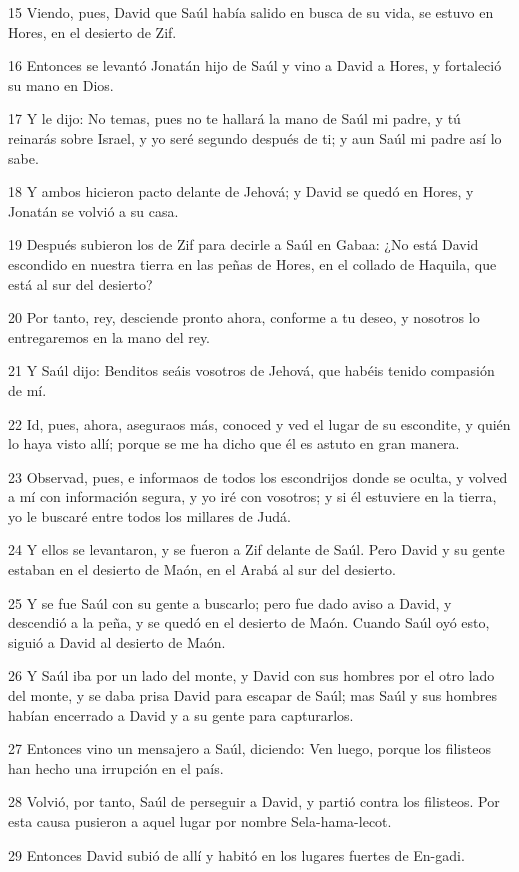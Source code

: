 \par 15 Viendo, pues, David que Saúl había salido en busca de su vida, se estuvo en Hores, en el desierto de Zif.
\par 16 Entonces se levantó Jonatán hijo de Saúl y vino a David a Hores, y fortaleció su mano en Dios.
\par 17 Y le dijo: No temas, pues no te hallará la mano de Saúl mi padre, y tú reinarás sobre Israel, y yo seré segundo después de ti; y aun Saúl mi padre así lo sabe.
\par 18 Y ambos hicieron pacto delante de Jehová; y David se quedó en Hores, y Jonatán se volvió a su casa.
\par 19 Después subieron los de Zif para decirle a Saúl en Gabaa: ¿No está David escondido en nuestra tierra en las peñas de Hores, en el collado de Haquila, que está al sur del desierto?
\par 20 Por tanto, rey, desciende pronto ahora, conforme a tu deseo, y nosotros lo entregaremos en la mano del rey.
\par 21 Y Saúl dijo: Benditos seáis vosotros de Jehová, que habéis tenido compasión de mí.
\par 22 Id, pues, ahora, aseguraos más, conoced y ved el lugar de su escondite, y quién lo haya visto allí; porque se me ha dicho que él es astuto en gran manera.
\par 23 Observad, pues, e informaos de todos los escondrijos donde se oculta, y volved a mí con información segura, y yo iré con vosotros; y si él estuviere en la tierra, yo le buscaré entre todos los millares de Judá.
\par 24 Y ellos se levantaron, y se fueron a Zif delante de Saúl. Pero David y su gente estaban en el desierto de Maón, en el Arabá al sur del desierto.
\par 25 Y se fue Saúl con su gente a buscarlo; pero fue dado aviso a David, y descendió a la peña, y se quedó en el desierto de Maón. Cuando Saúl oyó esto, siguió a David al desierto de Maón.
\par 26 Y Saúl iba por un lado del monte, y David con sus hombres por el otro lado del monte, y se daba prisa David para escapar de Saúl; mas Saúl y sus hombres habían encerrado a David y a su gente para capturarlos.
\par 27 Entonces vino un mensajero a Saúl, diciendo: Ven luego, porque los filisteos han hecho una irrupción en el país.
\par 28 Volvió, por tanto, Saúl de perseguir a David, y partió contra los filisteos. Por esta causa pusieron a aquel lugar por nombre Sela-hama-lecot.
\par 29 Entonces David subió de allí y habitó en los lugares fuertes de En-gadi.

